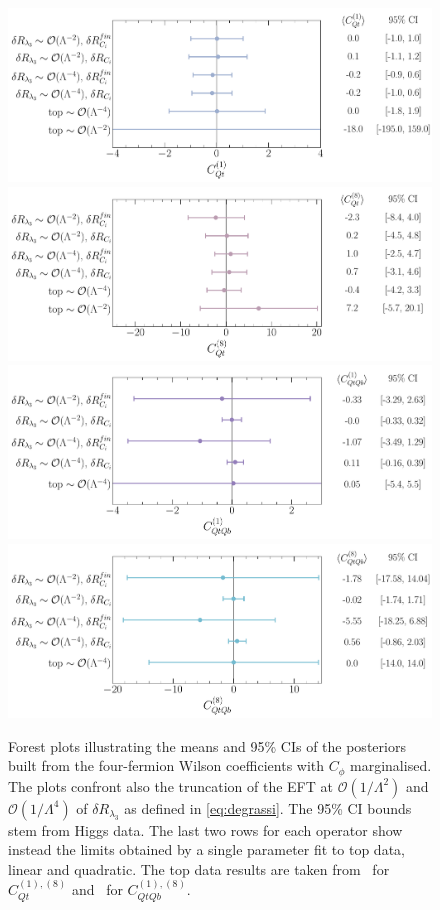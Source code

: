 %
\begin{figure}
	\vspace*{-0.5cm}
	\begin{center}
		\includegraphics[width=0.75\linewidth]{fig/uebeblick_Cqt1}
		\includegraphics[width=0.75\linewidth]{fig/uebeblick_Cqt8} 
		\includegraphics[width=0.75\linewidth]{fig/uebeblick_Cqtqb1}
		\includegraphics[width=0.75\linewidth]{fig/uebeblick_Cqtqb8}
	\end{center}
	\vspace*{-0.5cm}
	\caption{Forest plots illustrating the means and 95\% CIs of the posteriors built from the four-fermion Wilson coefficients with $C_\phi$ marginalised.  The plots confront also the truncation of the EFT at $\mathcal{O}(1/\Lambda^2)$ and $\mathcal{O}(1/\Lambda^4)$ of $\delta R_{\lambda_3}$ as defined in \eqref{eq:degrassi}. The 95\% CI bounds stem from Higgs data. The last two rows for each operator show instead the limits obtained by a single parameter fit to top data, linear and quadratic. The top data results are taken from~\cite{Ethier:2021bye} for $C_{Qt}^{(1),(8)}$ and~\cite{Hartland:2019bjb} for $C_{QtQb}^{(1),(8)}$. }
		\label{fig:summ4f}
\end{figure}
